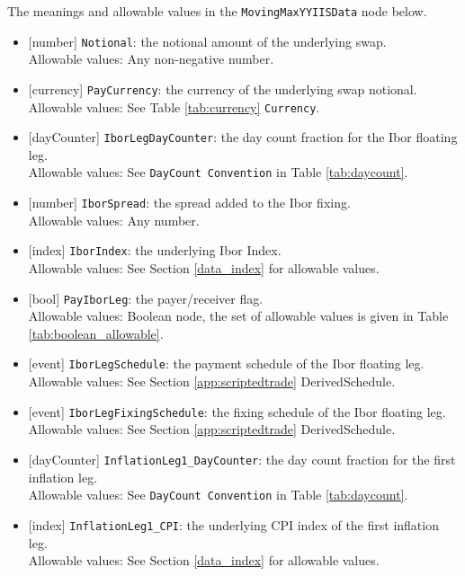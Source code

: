 The meanings and allowable values in the \lstinline!MovingMaxYYIISData! node below.

\begin{itemize}
  \item{}[number] \lstinline!Notional!: the notional amount of the underlying swap. \\
  Allowable values: Any non-negative number.
  \item{}[currency] \lstinline!PayCurrency!:  the currency of the underlying swap notional. \\
  Allowable values: See Table \ref{tab:currency} \lstinline!Currency!.
  \item{}[dayCounter] \lstinline!IborLegDayCounter!:  the day count fraction for the Ibor floating leg. \\
  Allowable values: See \lstinline!DayCount Convention! in Table \ref{tab:daycount}.
  \item{}[number] \lstinline!IborSpread!: the spread added to the Ibor fixing. \\
  Allowable values: Any number.
  \item{}[index] \lstinline!IborIndex!:  the underlying Ibor Index. \\
  Allowable values: See Section \ref{data_index} for allowable values.
  \item{}[bool] \lstinline!PayIborLeg!: the payer/receiver flag. \\
  Allowable values: Boolean node, the set of allowable values is given in Table \ref{tab:boolean_allowable}.
  \item{}[event] \lstinline!IborLegSchedule!:  the payment schedule of the Ibor floating leg. \\
  Allowable values: See Section \ref{app:scriptedtrade} DerivedSchedule.
  \item{}[event] \lstinline!IborLegFixingSchedule!: the fixing schedule of the Ibor floating leg. \\
  Allowable values: See Section \ref{app:scriptedtrade} DerivedSchedule.
  \item{}[dayCounter] \lstinline!InflationLeg1_DayCounter!: the day count fraction for the first inflation leg. \\
  Allowable values: See \lstinline!DayCount Convention! in Table \ref{tab:daycount}.
  \item{}[index] \lstinline!InflationLeg1_CPI!:  the underlying CPI index of the first inflation leg. \\
  Allowable values: See Section \ref{data_index} for allowable values.

\end{itemize}
